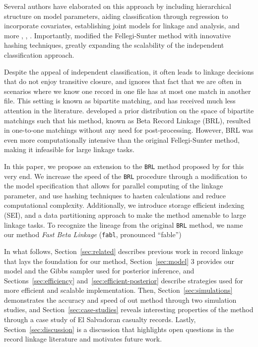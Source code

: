 \documentclass[12pt,letterpaper]{article}
\newcommand{\1}[1]{\mathbb{I}\!\left[#1\right]} %
\begin{document}
Several authors have elaborated on this approach by including hierarchical structure on model parameters, aiding classification through regression to incorporate covariates, establishing joint models for linkage and analysis, and more \citep{larsen2005}, \citep{hu2017}, \citep{hof2017}. Importantly, \citep{enamorado2019} modified the Fellegi-Sunter method with innovative hashing techniques, greatly expanding the scalability of the independent classification approach. 

Despite the appeal of independent classification, it often leads to linkage decisions that do not enjoy transitive closure, and ignores that fact that we are often in scenarios where we know one record in one file has at most one match in another file. This setting is known as bipartite matching, and has received much less attention in the literature. \citep{sadinle2017} developed a prior distribution on the space of bipartite matchings such that his method, known as Beta Record Linkage (BRL), resulted in one-to-one matchings without any need for post-processing. However, BRL was even more computationally intensive than the original Fellegi-Sunter method, making it infeasible for large linkage tasks. 

In this paper, we propose an extension to the \texttt{BRL} method proposed by \citep{sadinle2017} for this very end.  We increase the speed of the \texttt{BRL} procedure through a modification to the model specification that allows for parallel computing of the linkage parameter, and use hashing techniques to hasten calculations and reduce computational complexity. Additionally, we introduce storage efficient indexing (SEI), and a data partitioning approach to make the method amenable to large linkage tasks. To recognize the lineage from the original \texttt{BRL} method, we name our method \emph{Fast Beta Linkage} (\texttt{fabl},
pronounced ``fable'')

In what follows, Section~\ref{sec:related} describes previous work in record linkage that lays the foundation for our method, Section~\ref{sec:model}
3 provides our model and the Gibbs sampler used for posterior inference,
and Sections~\ref{sec:efficiency} and~\ref{sec:efficient-posterior} describe strategies used for more efficient and scalable
implementation. Then, Section~\ref{sec:simulations} demonstrates the accuracy and speed of
out method through two simulation studies, and Section~\ref{sec:case-studies} reveals
interesting properties of the method through a case study of El
Salvadoran casualty records. Lastly, Section~\ref{sec:discussion} is a discussion that highlights open
questions in the record linkage literature and motivates future work.
\end{document}
